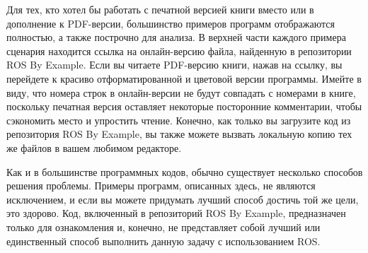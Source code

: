 

Для тех, кто хотел бы работать с печатной версией книги вместо или в дополнение к PDF-версии, большинство примеров программ отображаются полностью, а также построчно для анализа. В верхней части каждого примера сценария находится ссылка на онлайн-версию файла, найденную в репозитории ROS By Example. Если вы читаете PDF-версию книги, нажав на ссылку, вы перейдете к красиво отформатированной и цветовой версии программы. Имейте в виду, что номера строк в онлайн-версии не будут совпадать с номерами в книге, поскольку печатная версия оставляет некоторые посторонние комментарии, чтобы сэкономить место и упростить чтение. Конечно, как только вы загрузите код из репозитория ROS By Example, вы также можете вызвать локальную копию тех же файлов в вашем любимом редакторе. 

Как и в большинстве программных кодов, обычно существует несколько способов решения проблемы. Примеры программ, описанных здесь, не являются исключением, и если вы можете придумать лучший способ достичь той же цели, это здорово. Код, включенный в репозиторий ROS By Example, предназначен только для ознакомления и, конечно, не представляет собой лучший или единственный способ выполнить данную задачу с использованием ROS.

